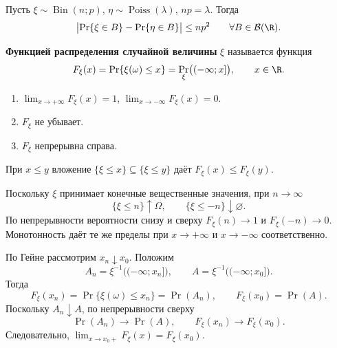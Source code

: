 \begin{theorem}
    Пусть $\xi\sim\operatorname{Bin}(n;p)$,
    $\eta\sim\operatorname{Poiss}(\lambda)$, $np=\lambda$.
    Тогда
    \[
        \bigl|\Pr\{\xi\in B\}-\Pr\{\eta\in B\}\bigr|
        \leq np^2
        \qquad\forall B\in\mathcal{B}(\R).
    \]
\end{theorem}


\begin{definition}
    \textbf{Функцией распределения случайной величины} $\xi$
    называется функция
    \[
        F_\xi(x)=\Pr\{\xi(\omega)\leq x\}
        =\Pr_\xi\bigl((-\infty;x]\bigr),\qquad x\in\R.
    \]
\end{definition}

\begin{theorem}
    \begin{enumerate}[label=\arabic*)]
        \item $\lim_{x\to+\infty}F_\xi(x)=1$,
        $\lim_{x\to-\infty}F_\xi(x)=0$.
        \item $F_\xi$ не убывает.
        \item $F_\xi$ непрерывна справа.
    \end{enumerate}
\end{theorem}

\begin{Proof}
При $x\leq y$ вложение $\{\xi\leq x\}\subseteq\{\xi\leq y\}$ даёт $F_\xi(x)\leq F_\xi(y)$.

\smallskip
Поскольку $\xi$ принимает конечные вещественные значения, при $n\to\infty$
\[
  \{\xi\leq n\}\uparrow\Omega,\qquad
  \{\xi\leq -n\}\downarrow\varnothing.
\]
По непрерывности вероятности снизу и сверху $F_\xi(n)\to 1$ и $F_\xi(-n)\to 0$.
Монотонность даёт те же пределы при $x\to+\infty$ и $x\to-\infty$ соответственно.
\end{Proof}

\begin{Proof}
    По Гейне рассмотрим $x_n\downarrow x_0$. Положим
    \[
        A_n=\xi^{-1}\bigl((-\infty;x_n]\bigr),
        \qquad A=\xi^{-1}\bigl((-\infty;x_0]\bigr).
    \]
    Тогда
    \[
        F_\xi(x_n)=\Pr\{\xi(\omega)\leq x_n\}=\Pr(A_n),
        \qquad F_\xi(x_0)=\Pr(A).
    \]
    Поскольку $A_n\downarrow A$, по непрерывности сверху
    \[
        \Pr(A_n)\longrightarrow\Pr(A),
        \qquad F_\xi(x_n)\longrightarrow F_\xi(x_0).
    \]
    Следовательно, $\lim_{x\to x_0+}F_\xi(x)=F_\xi(x_0)$.
\end{Proof}


